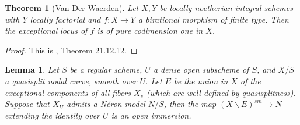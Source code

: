 \documentclass[a4paper,12pt]{amsart} %
\numberwithin{equation}{subsection}
\theoremstyle{definition}
\theoremstyle{plain}%
\newtheorem{lemma}[definition]{Lemma}
\newtheorem{theorem}[definition]{Theorem}
\theoremstyle{remark}
\begin{document}
\begin{theorem}[Van Der Waerden]\label{Van Der Waerden}
Let $X,Y$ be locally noetherian integral schemes with $Y$ locally factorial and $f:X\to Y$ a birational morphism of finite type. Then the exceptional locus of $f$ is of pure codimension one in $X$.
\end{theorem}

\begin{proof}
This is \cite{EGA4.4}, Theorem 21.12.12.
\end{proof}

\begin{lemma}\label{Van der Waerden dans un espace algebrique pour trouver les ouverts du NM (lemme)}
Let $S$ be a regular scheme, $U$ a dense open subscheme of $S$, and $X/S$ a quasisplit nodal curve, smooth over $U$. Let $E$ be the union in $X$ of the exceptional components of all fibers $X_s$ (which are well-defined by quasisplitness). Suppose that $X_U$ admits a N\'eron model $N/S$, then the map $(X\backslash E)^{sm}\to N$ extending the identity over $U$ is an open immersion.
\end{lemma}
\end{document}
